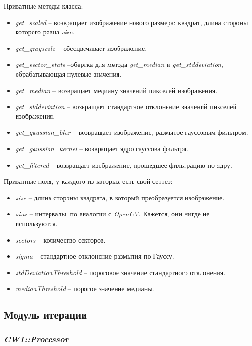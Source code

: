 Приватные методы класса:

\begin{itemize}
    \item \textit{get\_scaled} -- возвращает изображение нового размера:
          квадрат, длина стороны которого равна \textit{size}.
    \item \textit{get\_grayscale} -- обесцвечивает изображение.
    \item \textit{get\_sector\_stats} --обертка для метода \textit{get\_median}
          и \textit{get\_stddeviation}, обрабатывающая нулевые значения.
    \item \textit{get\_median} -- возвращает медиану значений пикселей
          изображения.
    \item \textit{get\_stddeviation} -- возвращает стандартное отклонение
          значений пикселей изображения.
    \item \textit{get\_gaussian\_blur} -- возвращает изображение, размытое
          гауссовым фильтром.
    \item \textit{get\_gaussian\_kernel} -- возвращает ядро гауссова фильтра.
    \item \textit{get\_filtered} -- возвращает изображение, прошедшее фильтрацию
          по ядру.
\end{itemize}

Приватные поля, у каждого из которых есть свой сеттер:

\begin{itemize}
    \item \textit{size} -- длина стороны квадрата, в который преобразуется
          изображение.
    \item \textit{bins} -- интервалы, по аналогии с \textit{OpenCV}. Кажется,
          они нигде не используются.
    \item \textit{sectors} -- количество секторов.
    \item \textit{sigma} -- стандартное отклонение размытия по Гауссу.
    \item \textit{stdDeviationThreshold} -- пороговое значение стандартного
          отклонения.
    \item \textit{medianThreshold} -- порогое значение медианы.
\end{itemize}

\subsection*{Модуль итерации}

\subsubsection{\textit{CW1::Processor}}

